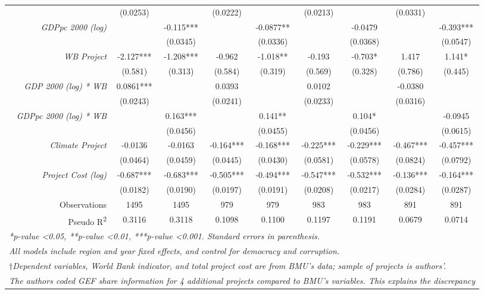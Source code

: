 \documentclass{article}
\begin{document}
\begin{singlespace}
\begin{table}[H]
{\begin{tabular}{rcccccccc}
				\textit{} & (0.0253) &  & (0.0222) &  & (0.0213) &  & (0.0331) &  \\
				\textit{GDPpc 2000 (log)} &  & -0.115*** &  & -0.0877** &  & -0.0479 &  & -0.393*** \\
				\textit{} &  & (0.0345) &  & (0.0336) &  & (0.0368) &  & (0.0547) \\
				\textit{WB Project} & -2.127*** & -1.208*** & -0.962 & -1.018** & -0.193 & -0.703* & 1.417 & 1.141* \\
				\textit{} & (0.581) & (0.313) & (0.584) & (0.319) & (0.569) & (0.328) & (0.786) & (0.445) \\
				\textit{GDP 2000 (log) * WB} & 0.0861*** &  & 0.0393 &  & 0.0102 &  & -0.0380 &  \\
				\textit{} & (0.0243) &  & (0.0241) &  & (0.0233) &  & (0.0316) &  \\
				\textit{GDPpc 2000 (log) * WB} &  & 0.163*** &  & 0.141** &  & 0.104* &  & -0.0945 \\
				\textit{} &  & (0.0456) &  & (0.0455) &  & (0.0456) &  & (0.0615) \\
				\textit{Climate Project} & -0.0136 & -0.0163 & -0.164*** & -0.168*** & -0.225*** & -0.229*** & -0.467*** & -0.457*** \\
				\textit{} & (0.0464) & (0.0459) & (0.0445) & (0.0430) & (0.0581) & (0.0578) & (0.0824) & (0.0792) \\
				\textit{Project Cost (log)} & -0.687*** & -0.683*** & -0.505*** & -0.494*** & -0.547*** & -0.532*** & -0.136*** & -0.164*** \\
				\textit{} & (0.0182) & (0.0190) & (0.0197) & (0.0191) & (0.0208) & (0.0217) & (0.0284) & (0.0287) \\ \hline
				Observations & 1495 & 1495 & 979 & 979 & 983 & 983 & 891 & 891 \\
				Pseudo R\textsuperscript{2} & 0.3116 & 0.3118 & 0.1098 & 0.1100 & 0.1197 & 0.1191 & 0.0679 & 0.0714 \\ \hline
			\multicolumn{9}{l}{\textit{*p-value \textless 0.05, **p-value \textless 0.01, ***p-value \textless 0.001.  Standard errors in parenthesis.}} \\
			\multicolumn{9}{l}{\textit{All models include region and year fixed effects, and control for democracy and corruption.}} \\
			\multicolumn{9}{l}{\textit{$\dagger$Dependent variables, World Bank indicator, and total project cost are from BMU's data; sample of projects is authors'.}} \\
			\multicolumn{9}{l}{\textit{The authors coded GEF share information for 4 additional projects compared to BMU's variables. This explains the discrepancy}} \\

\end{tabular}}
\end{table}
\end{singlespace}
\end{document}
